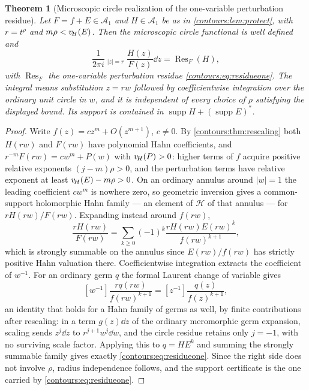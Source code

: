 \documentclass[11pt,letterpaper]{article}
\newtheorem{theorem}{Theorem}[section]
\theoremstyle{definition}
\theoremstyle{remark}
\newcommand{\HH}{\mathcal H}\newcommand{\A}{\mathscr A}\newcommand{\OO}{\mathcal O}
\newcommand{\supp}{\operatorname{supp}}\newcommand{\Res}{\operatorname{Res}}
\newcommand{\HCoint}{\mathop{\oint^{\!H}}\nolimits}
\numberwithin{equation}{section}
\begin{document}
\begin{theorem}[Microscopic circle realization of the one-variable perturbation
residue]\label{contours:thm:microcircle}
Let $F=f+E\in\A_1$ and $H\in\A_1$ be as in \cref{contours:lem:protect}, with
$r=t^\rho$ and $m\rho<v_{\!H}(E)$. Then the microscopic circle functional is well
defined and
\begin{equation}\label{contours:eq:microcircle}
 \boxed{\qquad
 \frac1{2\pi i}\HCoint_{|z|=r}\frac{H(z)}{F(z)}\dd z=\Res_F(H),
 \qquad}
\end{equation}
with $\Res_F$ the one-variable perturbation residue
\eqref{contours:eq:residueone}. The integral means substitution $z=rw$ followed by
coefficientwise integration over the ordinary unit circle in $w$, and it is
independent of every choice of $\rho$ satisfying the displayed bound. Its support is
contained in $\supp H+(\supp E)^*$.
\end{theorem}
\begin{proof}
Write $f(z)=cz^m+O(z^{m+1})$, $c\ne0$. By \cref{contours:thm:rescaling} both
$H(rw)$ and $F(rw)$ have polynomial Hahn coefficients, and
$r^{-m}F(rw)=cw^m+P(w)$ with $v_{\!H}(P)>0$: higher terms of $f$ acquire positive
relative exponents $(j-m)\rho>0$, and the perturbation terms have relative exponent
at least $v_{\!H}(E)-m\rho>0$. On an ordinary annulus around $|w|=1$ the leading
coefficient $cw^m$ is nowhere zero, so geometric inversion gives a common-support
holomorphic Hahn family --- an element of $\HH$ of that annulus --- for
$rH(rw)/F(rw)$. Expanding instead around $f(rw)$,
\[
  \frac{rH(rw)}{F(rw)}
  =\sum_{k\ge0}(-1)^k\frac{rH(rw)E(rw)^k}{f(rw)^{k+1}},
\]
which is strongly summable on the annulus since $E(rw)/f(rw)$ has strictly positive
Hahn valuation there. Coefficientwise integration extracts the coefficient of
$w^{-1}$. For an ordinary germ $q$ the formal Laurent change of variable gives
\[
  [w^{-1}]\frac{rq(rw)}{f(rw)^{k+1}}=[z^{-1}]\frac{q(z)}{f(z)^{k+1}} ,
\]
an identity that holds for a Hahn family of germs as well, by finite contributions
after rescaling: in a term $g(z)\dd z$ of the ordinary meromorphic germ expansion,
scaling sends $z^j\dd z$ to $r^{j+1}w^j\dd w$, and the circle residue retains only
$j=-1$, with no surviving scale factor. Applying this to $q=HE^k$ and summing the
strongly summable family gives exactly \eqref{contours:eq:residueone}. Since the
right side does not involve $\rho$, radius independence follows, and the support
certificate is the one carried by \eqref{contours:eq:residueone}.
\end{proof}
\end{document}
